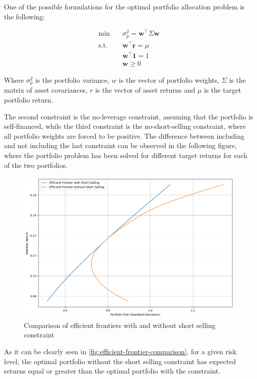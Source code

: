 One of the possible formulations for the optimal portfolio allocation problem is the following:

$$
\begin{aligned}
    \text{min} \quad & \sigma_p^2 = \mathbf{w}^\top \Sigma \mathbf{w} \\
    \text{s.t.} \quad & \mathbf{w}^\top \mathbf{r} = \mu \\
    & \mathbf{w}^\top \mathbf{1} = 1 \\
    & \mathbf{w} \geq 0
\end{aligned}
$$


Where $\sigma_p^2$ is the portfolio variance, $w$ is the vector of portfolio weights, $\Sigma$ is the matrix of asset covariances, $r$ is the vector of asset returns and $\mu$ is the target portfolio return. 

The second constraint is the no-leverage constraint, assuming that the portfolio is self-financed, while the third constraint is the no-short-selling constraint, where all portfolio weights are forced to be positive. 
The difference between including and not including the last constraint can be observed in the following figure, where the portfolio problem has been solved for different target returns for each of the two portfolios. 

\begin{figure}[h]
    \includegraphics[width=\linewidth]{assets/efficient-frontier-comparison.png}
    \caption{Comparison of efficient frontiers with and without short selling constraint}
    \label{fig:efficient-frontier-comparison}
\end{figure}

As it can be clearly seen in \autoref{fig:efficient-frontier-comparison}, for a given risk level, the optimal portfolio without the short selling constraint has expected returns equal or greater than the optimal portfolio with the constraint. 

